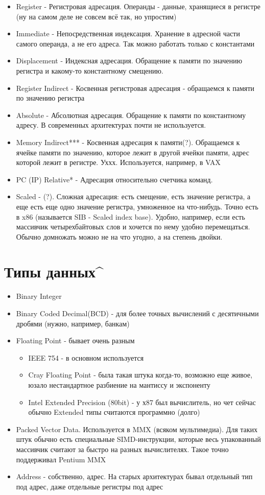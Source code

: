 \documentclass[12pt, a4paper]{article}
\begin{document}
\begin{itemize}
    \item Register - Регистровая адресация. Операнды - данные, хранящиеся в регистре (ну на самом деле не совсем всё так, но упростим)
    \item Immediate - Непосредственная индексация. Хранение в адресной части самого операнда, а не его адреса. Так можно работать только с константами
    \item Displacement - Индексная адресация. Обращение к памяти по значению регистра и какому-то константному смещению.
    \item Register Indirect - Косвенная регистровая адресация - обращаемся к памяти по значению регистра
    \item Absolute - Абсолютная адресация. Обращение к памяти по константному адресу. В современных архитектурах почти не используется.
    \item Memory Indirect*** - Косвенная адресация к памяти(?). Обращаемся к ячейке памяти по значению, которое лежит в другой ячейки памяти, адрес которой лежит в регистре. Уххх. Используется, например, в VAX
    \item PC (IP) Relative* - Адресация относительно счетчика команд.
    \item Scaled - (?). Сложная адресация: есть смещение, есть значение регистра, а еще есть еще одно значение регистра, умноженное на что-нибудь. Точно есть в x86 (называется SIB - Scaled index base). Удобно, например, если есть массивчик четырехбайтовых слов и хочется по нему удобно перемещаться. Обычно домножать можно не на что угодно, а на степень двойки.
\end{itemize}
\section{Типы данных\textasciicircum}
\begin{itemize}
    \item Binary Integer
    \item Binary Coded Decimal(BCD) - для более точных вычислений с десятичными дробями (нужно, например, банкам)
    \item Floating Point - бывает очень разным
    \begin{itemize}
        \item IEEE 754 - в основном используется
        \item Cray Floating Point - была такая штука когда-то, возможно еще живое, юзало нестандартное разбиение на мантиссу и экспоненту
        \item Intel Extended Precision (80bit) - у х87 был вычислитель, но чет сейчас обычно Extended типы считаются программно (долго)
    \end{itemize}
    \item Packed Vector Data. Используется в MMX (всяком мультимедиа). Для таких штук обычно есть специальные SIMD-инструкции, которые весь упакованный массивчик считают за быстро на разных вычислителях. Такое точно поддерживал Pentium MMX
    \item Address - собственно, адрес. На старых архитектурах бывал отдельный тип под адрес, даже отдельные регистры под адрес
\end{itemize}
\end{document}
